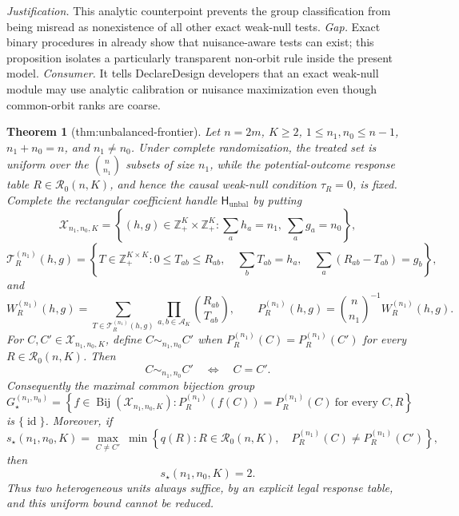 \documentclass{article}
\newtheorem{theorem}{Theorem}
\begin{document}
\par\smallskip\noindent \textit{Justification.} This analytic counterpoint prevents the group classification from being misread as nonexistence of all other exact weak-null tests. \textit{Gap.} Exact binary procedures in \cite{RigdonHudgens2015} already show that nuisance-aware tests can exist; this proposition isolates a particularly transparent non-orbit rule inside the present model. \textit{Consumer.} It tells DeclareDesign developers that an exact weak-null module may use analytic calibration or nuisance maximization even though common-orbit ranks are coarse.

\begin{theorem}[thm:unbalanced-frontier]\label{thm:unbalanced-frontier}
Let \(n=2m\), \(K\geq 2\), \(1\leq n_1,n_0\leq n-1\), \(n_1+n_0=n\), and \(n_1\neq n_0\). Under complete randomization, the treated set is uniform over the \(\binom n{n_1}\) subsets of size \(n_1\), while the potential-outcome response table \(R\in\mathcal R_0(n,K)\), and hence the causal weak-null condition \(\tau_R=0\), is fixed. Complete the rectangular coefficient handle \(\mathsf H_{\mathrm{unbal}}\) by putting
\[
 \mathcal X_{n_1,n_0,K}
 =\left\{(h,g)\in\mathbb Z_+^K\times\mathbb Z_+^K:
       \sum_a h_a=n_1,\ \sum_a g_a=n_0\right\},
\]
\[
 \mathcal T_R^{(n_1)}(h,g)
 =\left\{T\in\mathbb Z_+^{K\times K}:0\leq T_{ab}\leq R_{ab},\quad
       \sum_bT_{ab}=h_a,\quad \sum_a(R_{ab}-T_{ab})=g_b\right\},
\]
and
\[
 W_R^{(n_1)}(h,g)
 =\sum_{T\in\mathcal T_R^{(n_1)}(h,g)}
       \prod_{a,b\in\mathcal A_K}\binom{R_{ab}}{T_{ab}},
 \qquad
 P_R^{(n_1)}(h,g)=\binom n{n_1}^{-1}W_R^{(n_1)}(h,g).
\]
For \(C,C'\in\mathcal X_{n_1,n_0,K}\), define \(C\sim_{n_1,n_0}C'\) when \(P_R^{(n_1)}(C)=P_R^{(n_1)}(C')\) for every \(R\in\mathcal R_0(n,K)\). Then
\[
 C\sim_{n_1,n_0}C'\quad\Longleftrightarrow\quad C=C'.
\]
Consequently the maximal common bijection group
\[
 G_\star^{(n_1,n_0)}
 =\left\{f\in\operatorname{Bij}(\mathcal X_{n_1,n_0,K}):
 P_R^{(n_1)}(f(C))=P_R^{(n_1)}(C)\ \text{for every }C,R\right\}
\]
is \(\{\operatorname{id}\}\). Moreover, if
\[
 s_\star(n_1,n_0,K)
 =\max_{C\neq C'}\ \min\left\{q(R):R\in\mathcal R_0(n,K),\quad
       P_R^{(n_1)}(C)\neq P_R^{(n_1)}(C')\right\},
\]
then
\[
 s_\star(n_1,n_0,K)=2.
\]
Thus two heterogeneous units always suffice, by an explicit legal response table, and this uniform bound cannot be reduced.
\end{theorem}
\end{document}
